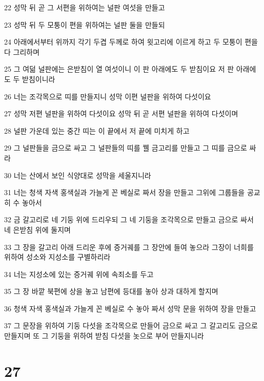 \par 22 성막 뒤 곧 그 서편을 위하여는 널판 여섯을 만들고
\par 23 성막 뒤 두 모퉁이 편을 위하여는 널판 둘을 만들되
\par 24 아래에서부터 위까지 각기 두겹 두께로 하여 윗고리에 이르게 하고 두 모퉁이 편을 다 그리하며
\par 25 그 여덞 널판에는 은받침이 열 여섯이니 이 판 아래에도 두 받침이요 저 판 아래에도 두 받침이니라
\par 26 너는 조각목으로 띠를 만들지니 성막 이편 널판을 위하여 다섯이요
\par 27 성막 저편 널판을 위하여 다섯이요 성막 뒤 곧 서편 널판을 위하여 다섯이며
\par 28 널판 가운데 있는 중간 띠는 이 끝에서 저 끝에 미치게 하고
\par 29 그 널판들을 금으로 싸고 그 널판들의 띠를 꿸 금고리를 만들고 그 띠를 금으로 싸라
\par 30 너는 산에서 보인 식양대로 성막을 세울지니라
\par 31 너는 청색 자색 홍색실과 가늘게 꼰 베실로 짜서 장을 만들고 그위에 그룹들을 공교히 수 놓아서
\par 32 금 갈고리로 네 기둥 위에 드리우되 그 네 기둥을 조각목으로 만들고 금으로 싸서 네 은받침 위에 둘지며
\par 33 그 장을 갈고리 아래 드리운 후에 증거궤를 그 장안에 들여 놓으라 그장이 너희를 위하여 성소와 지성소를 구별하리라
\par 34 너는 지성소에 있는 증거궤 위에 속죄소를 두고
\par 35 그 장 바깥 북편에 상을 놓고 남편에 등대를 놓아 상과 대하게 할지며
\par 36 청색 자색 홍색실과 가늘게 꼰 베실로 수 놓아 짜서 성막 문을 위하여 장을 만들고
\par 37 그 문장을 위하여 기둥 다섯을 조각목으로 만들어 금으로 싸고 그 갈고리도 금으로 만들지며 또 그 기둥을 위하여 받침 다섯을 놋으로 부어 만들지니라

\chapter{27}

